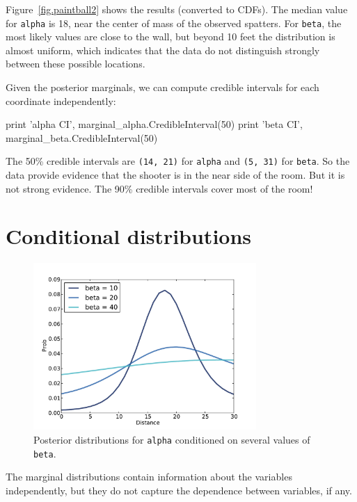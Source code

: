 \documentclass[12pt]{book}
\theoremstyle{exercise}
\begin{document}
Figure~\ref{fig.paintball2} shows the results (converted to CDFs).
The median value for {\tt alpha} is 18, near the center of mass of
the observed spatters.  For {\tt beta}, the most likely values are
close to the wall, but beyond 10 feet the distribution is almost
uniform, which indicates that the data do not distinguish strongly
between these possible locations.

Given the posterior marginals, we can compute credible intervals
for each coordinate independently:

\begin{code}
    print 'alpha CI', marginal_alpha.CredibleInterval(50)
    print 'beta CI', marginal_beta.CredibleInterval(50)
\end{code}

The 50\% credible intervals are {\tt (14, 21)} for {\tt alpha} and
{\tt (5, 31)} for {\tt beta}.  So the data provide evidence that the
shooter is in the near side of the room.  But it is not strong
evidence.  The 90\% credible intervals cover most of the room!


\section{Conditional distributions}
\label{conditional}

\begin{figure}
\centerline{\includegraphics[height=2.5in]{figs/paintball3.pdf}}
\caption{Posterior distributions for {\tt alpha} conditioned on several values
of {\tt beta}.}
\label{fig.paintball3}
\end{figure}

The marginal distributions contain information about the variables
independently, but they do not capture the dependence between
variables, if any.
\end{document}
